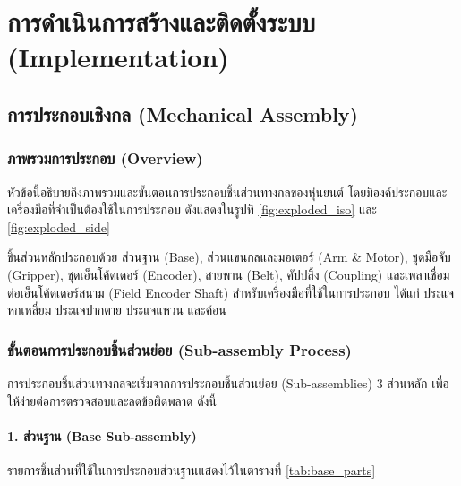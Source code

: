 \section{การดำเนินการสร้างและติดตั้งระบบ (Implementation)}
\label{sec:implementation}

\subsection{การประกอบเชิงกล (Mechanical Assembly)}
\label{sec:mech_assembly}

\subsubsection{ภาพรวมการประกอบ (Overview)}
\label{sec:mech_overview}
หัวข้อนี้อธิบายถึงภาพรวมและขั้นตอนการประกอบชิ้นส่วนทางกลของหุ่นยนต์ โดยมีองค์ประกอบและเครื่องมือที่จำเป็นต้องใช้ในการประกอบ ดังแสดงในรูปที่ \ref{fig:exploded_iso} และ \ref{fig:exploded_side}

ชิ้นส่วนหลักประกอบด้วย ส่วนฐาน (Base), ส่วนแขนกลและมอเตอร์ (Arm \& Motor), ชุดมือจับ (Gripper), ชุดเอ็นโค้ดเดอร์ (Encoder), สายพาน (Belt), คัปปลิ้ง (Coupling) และเพลาเชื่อมต่อเอ็นโค้ดเดอร์สนาม (Field Encoder Shaft) สำหรับเครื่องมือที่ใช้ในการประกอบ ได้แก่ ประแจหกเหลี่ยม ประแจปากตาย ประแจแหวน และค้อน



\subsubsection{ขั้นตอนการประกอบชิ้นส่วนย่อย (Sub-assembly Process)}
\label{sec:sub_assembly}
การประกอบชิ้นส่วนทางกลจะเริ่มจากการประกอบชิ้นส่วนย่อย (Sub-assemblies) 3 ส่วนหลัก เพื่อให้ง่ายต่อการตรวจสอบและลดข้อผิดพลาด ดังนี้

\paragraph{1. ส่วนฐาน (Base Sub-assembly)}
\label{sec:base_assembly}
รายการชิ้นส่วนที่ใช้ในการประกอบส่วนฐานแสดงไว้ในตารางที่ \ref{tab:base_parts}

